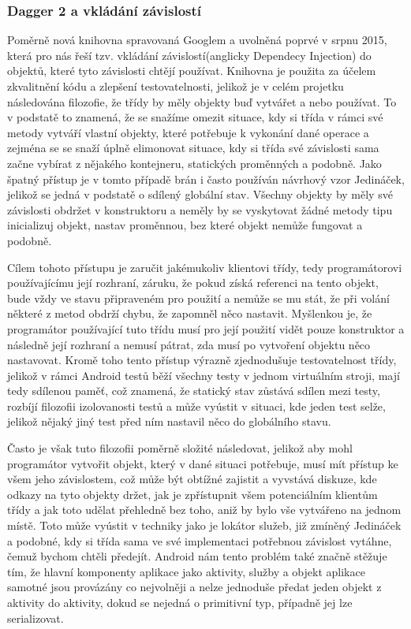 \documentclass{article}
\begin{document}
\subsubsection{Dagger 2 a vkládání závislostí}
Poměrně nová knihovna spravovaná Googlem a uvolněná poprvé v srpnu 2015, která pro nás řeší tzv. vkládání
závislostí(anglicky Dependecy Injection) do objektů,
které tyto závislosti chtějí používat. Knihovna je použita za účelem zkvalitnění kódu a zlepšení testovatelnosti, jelikož
je v celém projetku následována filozofie, že třídy by měly objekty buď vytvářet a nebo používat. To v podstatě to znamená,
že se snažíme omezit situace, kdy si třída v rámci své metody vytváří vlastní objekty, které potřebuje k vykonání
dané operace a zejména se se snaží úplně elimonovat situace, kdy si třída své závislosti sama začne vybírat z nějakého
kontejneru, statických proměnných a podobně. Jako špatný přístup je v tomto případě brán i často používán návrhový vzor
Jedináček, jelikož se jedná v podstatě o sdílený globální stav. Všechny objekty by měly své závislosti obdržet v konstruktoru
a neměly by se vyskytovat žádné metody tipu inicializuj objekt, nastav proměnnou, bez které objekt nemůže fungovat a podobně.

Cílem tohoto přístupu je zaručit jakémukoliv klientovi třídy, tedy programátorovi používajícímu její rozhraní,
záruku, že pokud získá referenci na tento objekt, bude vždy ve stavu připraveném pro použití a nemůže se mu stát,
že při volání některé z metod obdrží chybu, že zapomněl něco nastavit. Myšlenkou je, že programátor používající
tuto třídu musí pro její použití vidět pouze konstruktor a následně její rozhraní a nemusí pátrat, zda musí po
vytvoření objektu něco nastavovat. Kromě toho tento přístup výrazně zjednodušuje testovatelnost třídy, jelikož v rámci
Android testů běží všechny testy v jednom virtuálním stroji, mají tedy sdílenou paměť, což znamená, že statický
stav zůstává sdílen mezi testy, rozbíjí filozofii izolovanosti testů a může vyústit v situaci, kde jeden test selže,
jelikož nějaký jiný test před ním nastavil něco do globálního stavu.

Často je však tuto filozofii poměrně složité následovat, jelikož aby mohl programátor vytvořit objekt, který
v dané situaci potřebuje, musí mít přístup ke všem jeho závislostem, což může být obtížné zajistit
a vyvstává diskuze, kde odkazy na tyto objekty držet, jak je zpřístupnit všem potenciálním klientům třídy
a jak toto udělat přehledně bez toho, aniž by bylo vše vytvářeno na jednom místě. Toto může vyústit v techniky
jako je lokátor služeb, již zmíněný Jedináček a podobné, kdy si třída sama ve své implementaci potřebnou
závislost vytáhne, čemuž bychom chtěli předejít.
Android nám tento problém také značně stěžuje tím, že hlavní komponenty aplikace jako aktivity, služby a objekt
aplikace samotné jsou provázány co nejvolněji a nelze jednoduše předat jeden objekt z aktivity do aktivity,
dokud se nejedná o primitivní typ, případně jej lze serializovat.
\end{document}
